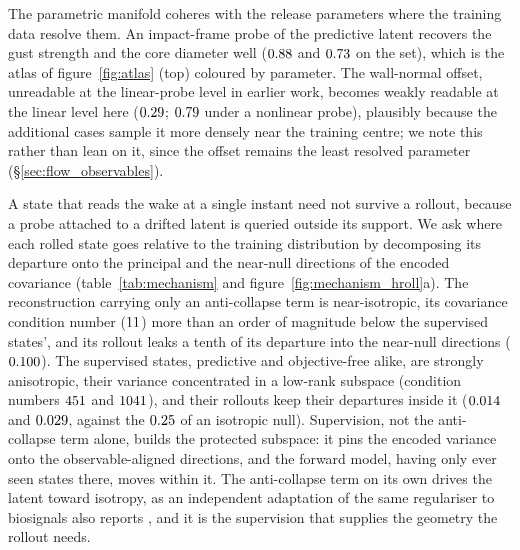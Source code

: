 The parametric manifold coheres with the release parameters where the training data resolve them. An impact-frame probe of the predictive latent recovers the gust strength and the core diameter well ($0.88$ and $0.73$ on the \TestSplit{} set), which is the atlas of figure~\ref{fig:atlas} (top) coloured by parameter. The wall-normal offset, unreadable at the linear-probe level in earlier work, becomes weakly readable at the linear level here ($0.29$; $0.79$ under a nonlinear probe), plausibly because the additional cases sample it more densely near the training centre; we note this rather than lean on it, since the offset remains the least resolved parameter (\S\ref{sec:flow_observables}).\re

A state that reads the wake at a single instant need not survive a rollout, because a probe attached to a drifted latent is queried outside its support. We ask where each rolled state goes relative to the training distribution by decomposing its departure onto the principal and the near-null directions of the encoded covariance (table~\ref{tab:mechanism} and figure~\ref{fig:mechanism_hroll}a). The reconstruction carrying only an anti-collapse term is near-isotropic, its covariance condition number ($11$) more than an order of magnitude below the supervised states', and its rollout leaks a tenth of its departure into the near-null directions ($0.100$). The supervised states, predictive and objective-free alike, are strongly anisotropic, their variance concentrated in a low-rank subspace (condition numbers $451$ and $1041$), and their rollouts keep their departures inside it ($0.014$ and $0.029$, against the $0.25$ of an isotropic null). Supervision, not the anti-collapse term alone, builds the protected subspace: it pins the encoded variance onto the observable-aligned directions, and the forward model, having only ever seen states there, moves within it. The anti-collapse term on its own drives the latent toward isotropy, as an independent adaptation of the same regulariser to biosignals also reports \citep{broustail2026}, and it is the supervision that supplies the geometry the rollout needs.\re

